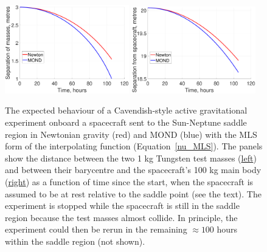 \documentclass[fleqn,usenatbib,useAMS,onecolumn]{mnras} %
\begin{document}
\begin{figure}
	\centering
	\includegraphics[width=0.48\textwidth]{Sep_Cavendish_Neptune}
	\hfill
	\includegraphics[width=0.48\textwidth]{Sep_bc_Neptune}
	\caption{The expected behaviour of a Cavendish-style active gravitational experiment onboard a spacecraft sent to the Sun-Neptune saddle region in Newtonian gravity (red) and MOND (blue) with the MLS form of the interpolating function (Equation~\ref{nu_MLS}). The panels show the distance between the two 1 kg Tungsten test masses (\underline{left}) and between their barycentre and the spacecraft's 100 kg main body (\underline{right}) as a function of time since the start, when the spacecraft is assumed to be at rest relative to the saddle point (see the text). The experiment is stopped while the spacecraft is still in the saddle region because the test masses almost collide. In principle, the experiment could then be rerun in the remaining $\approx 100$ hours within the saddle region (not shown).}
	\label{Saddle_point_test}
\end{figure}
\end{document}
